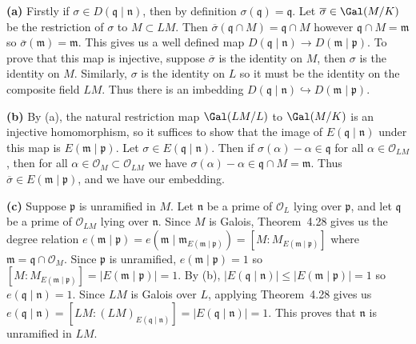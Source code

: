 \documentclass[11pt,letterpaper]{article}
\begin{document}
\begin{solution}
    \textbf{(a)} Firstly if $\sigma\in D(\mathfrak{q}\mid \mathfrak{n})$, then by definition $\sigma(\mathfrak{q}) = \mathfrak{q}$. Let $\overline{\sigma}\in \Gal(M /K)$ be the restriction of $\sigma$ to $M\subset LM$. Then $\overline{\sigma}(\mathfrak{q}\cap M)=\mathfrak{q}\cap M$ however $\mathfrak{q}\cap M=\mathfrak{m}$ so $\overline{\sigma}(\mathfrak{m})=\mathfrak{m}$. This gives us a well defined map $D(\mathfrak{q}\mid \mathfrak{n}) \to D(\mathfrak{m}\mid \mathfrak{p})$. To prove that this map is injective, suppose $\overline{\sigma}$ is the identity on $M$, then $\sigma$ is the identity on $M$. Similarly, $\sigma$ is the identity on $L$ so it must be the identity on the composite field $LM$. Thus there is an imbedding $D(\mathfrak{q}\mid \mathfrak{n})\hookrightarrow D(\mathfrak{m}\mid \mathfrak{p})$.        

    \textbf{(b)} By (a), the natural restriction map $\Gal(LM /L)$ to $\Gal(M / K)$ is an injective homomorphism, so it suffices to show that the image of $E(\mathfrak{q}\mid \mathfrak{n})$ under this map is $E(\mathfrak{m}\mid \mathfrak{p})$. Let $\sigma\in E(\mathfrak{q}\mid \mathfrak{n})$. Then if $\sigma(\alpha)-\alpha\in \mathfrak{q}$ for all $\alpha\in \mathcal{O}_{LM}$, then for all $\alpha\in \mathcal{O}_M\subset \mathcal{O}_{LM}$ we have $\sigma(\alpha)-\alpha\in \mathfrak{q}\cap M = \mathfrak{m}$. Thus $\overline{\sigma}\in E(\mathfrak{m}\mid \mathfrak{p})$, and we have our embedding.  

    \textbf{(c)} Suppose $\mathfrak{p}$ is unramified in $M$. Let $\mathfrak{n}$ be a prime of $\mathcal{O}_L$ lying over $\mathfrak{p}$, and let $\mathfrak{q}$ be a prime of $\mathcal{O}_{LM}$ lying over $\mathfrak{n}$. Since $M$ is Galois, Theorem~4.28 gives us the degree relation $e(\mathfrak{m}\mid \mathfrak{p})=e(\mathfrak{m}\mid \mathfrak{m}_{E(\mathfrak{m}\mid \mathfrak{p})}) = [M : M_{E(\mathfrak{m}\mid \mathfrak{p})}]$ where $\mathfrak{m}=\mathfrak{q}\cap \mathcal{O}_M$. Since $\mathfrak{p}$ is unramified, $e(\mathfrak{m}\mid \mathfrak{p})=1$ so $[M : M_{E(\mathfrak{m}\mid \mathfrak{p})}]=|E(\mathfrak{m}\mid \mathfrak{p})|=1$. By (b), $|E(\mathfrak{q}\mid \mathfrak{n})|\leq |E(\mathfrak{m}\mid \mathfrak{p})|=1$ so $e(\mathfrak{q}\mid \mathfrak{n})=1$. Since $LM$ is Galois over $L$, applying Theorem~4.28 gives us $e(\mathfrak{q}\mid \mathfrak{n})=[LM : (LM)_{E(\mathfrak{q}\mid \mathfrak{n})}]=|E(\mathfrak{q}\mid \mathfrak{n})|=1$. This proves that $\mathfrak{n}$ is unramified in $LM$.   
\end{solution}
\end{document}
